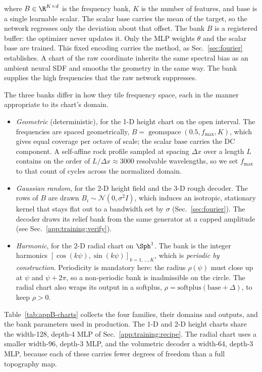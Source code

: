 where $B\in\R^{K\times d}$ is the frequency bank, $K$ is the number of features, and $\mathrm{base}$ is a single learnable scalar. The scalar $\mathrm{base}$ carries the mean of the target, so the network regresses only the deviation about that offset. The bank $B$ is a registered buffer: the optimizer never updates it. Only the MLP weights $\theta$ and the scalar $\mathrm{base}$ are trained. This fixed encoding carries the method, as Sec.~\ref{sec:fourier} establishes. A chart of the raw coordinate inherits the same spectral bias as an ambient neural SDF and smooths the geometry in the same way. The bank supplies the high frequencies that the raw network suppresses.

The three banks differ in how they tile frequency space, each in the manner appropriate to its chart's domain.

\begin{itemize}
\item \emph{Geometric} (deterministic), for the 1-D height chart on the open interval. The frequencies are spaced geometrically, $B=\operatorname{geomspace}(0.5,f_{\max},K)$, which gives equal coverage per octave of scale; the scalar $\mathrm{base}$ carries the DC component. A self-affine rock profile sampled at spacing $\Delta x$ over a length $L$ contains on the order of $L/\Delta x\approx 3000$ resolvable wavelengths, so we set $f_{\max}$ to that count of cycles across the normalized domain.
\item \emph{Gaussian random}, for the 2-D height field and the 3-D rough decoder. The rows of $B$ are drawn $B_i\sim\mathcal N(0,\sigma^2 I)$, which induces an isotropic, stationary kernel that stays flat out to a bandwidth set by $\sigma$ (Sec.~\ref{sec:fourier}). The decoder draws its relief bank from the same generator at a capped amplitude (see Sec.~\ref{app:training:verify}).
\item \emph{Harmonic}, for the 2-D radial chart on $\Sph^1$. The bank is the integer harmonics $[\cos(k\psi),\sin(k\psi)]_{k=1,\dots,K}$, which is \emph{periodic by construction}. Periodicity is mandatory here: the radius $\rho(\psi)$ must close up at $\psi$ and $\psi+2\pi$, so a non-periodic bank is inadmissible on the circle. The radial chart also wraps its output in a softplus, $\rho=\mathrm{softplus}(\mathrm{base}+\Delta)$, to keep $\rho>0$.
\end{itemize}

Table~\ref{tab:appB-charts} collects the four families, their domains and outputs, and the bank parameters used in production. The 1-D and 2-D height charts share the width-128, depth-4 MLP of Sec.~\ref{app:training:recipe}. The radial chart uses a smaller width-96, depth-3 MLP, and the volumetric decoder a width-64, depth-3 MLP, because each of these carries fewer degrees of freedom than a full topography map.


